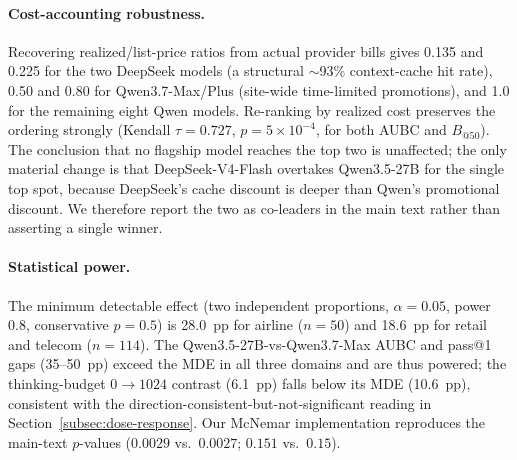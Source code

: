 \documentclass[preprint,authoryear,12pt]{elsarticle}
\begin{document}
\paragraph{Cost-accounting robustness.} Recovering realized/list-price ratios from actual provider bills gives 0.135 and 0.225 for the two DeepSeek models (a structural $\sim$93\% context-cache hit rate), 0.50 and 0.80 for Qwen3.7-Max/Plus (site-wide time-limited promotions), and 1.0 for the remaining eight Qwen models. Re-ranking by realized cost preserves the ordering strongly (Kendall $\tau=0.727$, $p=5\times10^{-4}$, for both AUBC and $B_{@50}$). The conclusion that no flagship model reaches the top two is unaffected; the only material change is that DeepSeek-V4-Flash overtakes Qwen3.5-27B for the single top spot, because DeepSeek's cache discount is deeper than Qwen's promotional discount. We therefore report the two as co-leaders in the main text rather than asserting a single winner.

\paragraph{Statistical power.} The minimum detectable effect (two independent proportions, $\alpha=0.05$, power 0.8, conservative $p=0.5$) is 28.0~pp for airline ($n=50$) and 18.6~pp for retail and telecom ($n=114$). The Qwen3.5-27B-vs-Qwen3.7-Max AUBC and pass@1 gaps (35--50~pp) exceed the MDE in all three domains and are thus powered; the thinking-budget $0\!\to\!1024$ contrast (6.1~pp) falls below its MDE (10.6~pp), consistent with the direction-consistent-but-not-significant reading in Section~\ref{subsec:dose-response}. Our McNemar implementation reproduces the main-text $p$-values ($0.0029$ vs.\ $0.0027$; $0.151$ vs.\ $0.15$).




\end{document}
